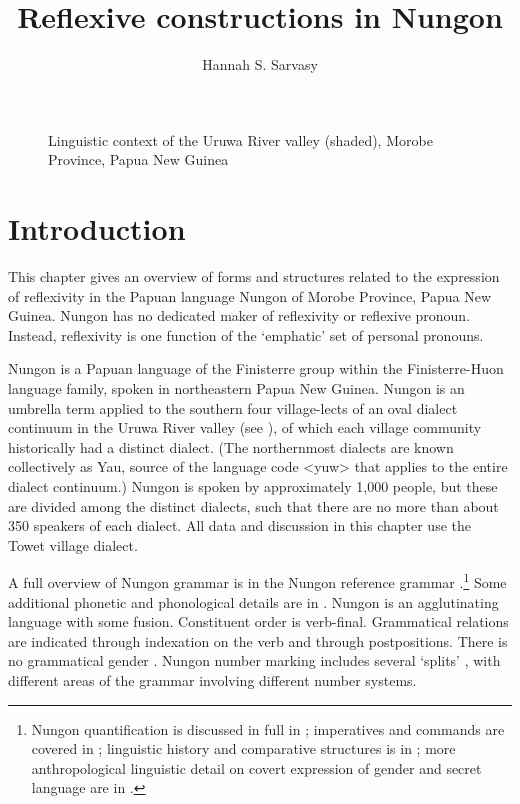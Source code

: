 \documentclass[output=paper,colorlinks,citecolor=brown]{langscibook}
\author{Hannah S. Sarvasy\affiliation{Western Sydney University}}
\title{Reflexive constructions in Nungon}
\begin{document}
\maketitle 

\begin{figure}
    \caption{Linguistic context of the Uruwa River valley (shaded), Morobe Province, Papua New Guinea \citep[7]{Sarvasy2017Grammar}}
    \label{fig:sarvasy:1}
\end{figure}

\section{Introduction}\label{sec:sarvasy:1}

This chapter gives an overview of forms and structures related to the expression of reflexivity in the Papuan language Nungon of Morobe Province, Papua New Guinea. Nungon has no dedicated maker of reflexivity or reflexive pronoun. Instead, reflexivity is one function of the ‘emphatic’ set of personal pronouns.


Nungon is a Papuan language of the Finisterre group within the Finisterre-Huon language family, spoken in northeastern Papua New Guinea. Nungon is an umbrella term applied to the southern four village-lects of an oval dialect continuum in the Uruwa River valley (see ), of which each village community historically had a distinct dialect. (The northernmost dialects are known collectively as Yau, source of the language code <yuw> that applies to the entire dialect continuum.) Nungon is spoken by approximately 1,000 people, but these are divided among the distinct dialects, such that there are no more than about 350 speakers of each dialect. All data and discussion in this chapter use the Towet village dialect. 

A full overview of Nungon grammar is in the Nungon reference grammar \citep{Sarvasy2017Grammar}.\footnote{Nungon quantification is discussed in full in \citet{Sarvasy2017Quant}; imperatives and commands are covered in \citet{Sarvasy2017Commands}; linguistic history and comparative structures is in \citet{Sarvasy2013, Sarvasy2014Finisterre}; more anthropological linguistic detail on covert expression of gender and secret language are in \citet{Sarvasy2016Gender, Sarvasy2019Taboo}.}  Some additional phonetic and phonological details are in \citet{SarvasyEtAl2019Vowel, SarvasyEtAl2019Analysis, SarvasyEtAl2020}. Nungon is an agglutinating language with some fusion. Constituent order is verb-final. Grammatical relations are indicated through indexation on the verb and through postpositions. There is no grammatical gender \citep{Sarvasy2016Gender}. Nungon number marking includes several ‘splits’ \citep{Sarvasy2018Multiple}, with different areas of the grammar involving different number systems. 
\end{document}
